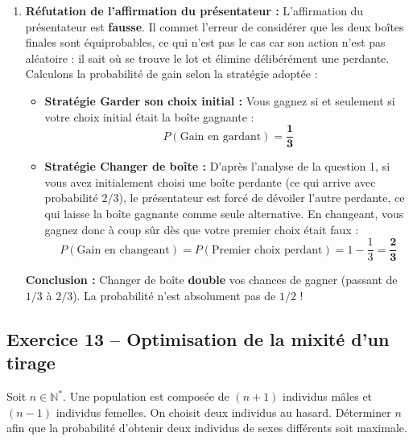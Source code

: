 \documentclass[11pt,a4paper]{article}
\newcommand{\N}{\mathbb{N}}
\begin{document}
\begin{correctionbox}
\begin{enumerate}[label=\arabic*.]
    \item \textbf{Réfutation de l'affirmation du présentateur :}
    L'affirmation du présentateur est \textbf{fausse}. Il commet l'erreur de considérer que les deux boîtes finales sont équiprobables, ce qui n'est pas le cas car son action n'est pas aléatoire : il sait où se trouve le lot et élimine délibérément une perdante.
    Calculons la probabilité de gain selon la stratégie adoptée :
    \begin{itemize}[label=$\bullet$]
        \item \textbf{Stratégie \og Garder son choix initial \fg{} :}
        Vous gagnez si et seulement si votre choix initial était la boîte gagnante :
        \[
        P(\text{Gain en gardant}) = \mathbf{\frac{1}{3}}
        \]
        \item \textbf{Stratégie \og Changer de boîte \fg{} :}
        D'après l'analyse de la question 1, si vous avez initialement choisi une boîte perdante (ce qui arrive avec probabilité $2/3$), le présentateur est forcé de dévoiler l'autre perdante, ce qui laisse la boîte gagnante comme seule alternative. En changeant, vous gagnez donc à coup sûr dès que votre premier choix était faux :
        \[
        P(\text{Gain en changeant}) = P(\text{Premier choix perdant}) = 1 - \frac{1}{3} = \mathbf{\frac{2}{3}}
        \]
    \end{itemize}
    \textbf{Conclusion :} Changer de boîte \textbf{double} vos chances de gagner (passant de $1/3$ à $2/3$). La probabilité n'est absolument pas de $1/2$ !
\end{enumerate}
\end{correctionbox}

\vspace{0.3cm}

\subsection*{Exercice 13 -- Optimisation de la mixité d'un tirage}

Soit $n \in \N^*$. Une population est composée de $(n+1)$ individus mâles et $(n-1)$ individus femelles. On choisit deux individus au hasard.
Déterminer $n$ afin que la probabilité d'obtenir deux individus de sexes différents soit maximale.
\end{document}
